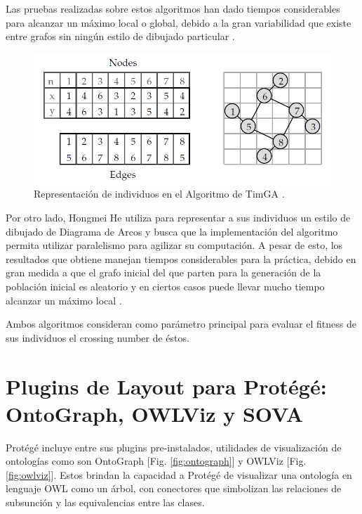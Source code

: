 Las pruebas realizadas sobre estos algoritmos han dado tiempos considerables para alcanzar un máximo local o global, debido a la gran variabilidad que existe entre grafos sin ningún estilo de dibujado particular \cite{gibson2013survey}.

\begin{figure}[H]
	\centering
	\includegraphics[width=13cm]{imagenes/timga_representacion.png}
	\caption{Representación de individuos en el Algoritmo de TimGA \cite{eloranta2001timga}.}
	\label{fig:timga_representacion}
\end{figure}

Por otro lado, Hongmei He\cite{he2007parallelisation} utiliza para representar a sus individuos un estilo de dibujado de Diagrama de Arcos  y busca que la implementación del algoritmo permita utilizar paralelismo para agilizar su computación. A pesar de esto, los resultados que obtiene manejan tiempos considerables para la práctica, debido en gran medida a que el grafo inicial del que parten para la generación de la población inicial es aleatorio y en ciertos casos puede llevar mucho tiempo alcanzar un máximo local \cite{gibson2013survey}.

Ambos algoritmos consideran como parámetro principal para evaluar el fitness de sus individuos el crossing number de éstos.

	
\section{Plugins de Layout para Protégé: OntoGraph, OWLViz y SOVA}
Protégé \cite{knublauch2004protege} incluye entre sus plugins pre-instalados, utilidades de visualización de ontologías como son OntoGraph \cite{falconer2010ontograf}[Fig. \ref{fig:ontograph}] y OWLViz \cite{horridge2010owlviz} [Fig. \ref{fig:owlviz}]. Estos brindan la capacidad a Protégé de visualizar una ontología en lenguaje OWL como un árbol, con conectores que simbolizan las relaciones de subsunción y las equivalencias entre las clases.

